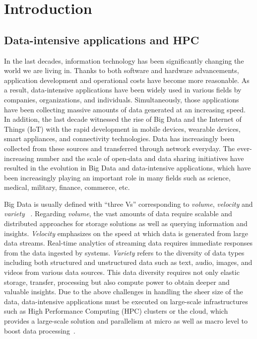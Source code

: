 \chapter{Introduction}
\label{introduction}

\section{Data-intensive applications and HPC}

In the last decades, information technology has been significantly changing the 
world we are living in. 
Thanks to both software and hardware advancements, application development 
and operational costs have become more reasonable. 
As a result, data-intensive applications have been widely used in various fields 
by companies, organizations, and individuals. 
Simultaneously, those applications have been 
collecting massive amounts of data generated at an increasing speed.
In addition, the last decade witnessed the rise of Big Data and the Internet of Things (IoT) with the rapid 
development in mobile devices, wearable devices, smart appliances, 
and connectivity technologies. Data has increasingly been collected from 
these sources and transferred through network everyday. 
The ever-increasing number and the scale of open-data and data sharing initiatives 
have resulted in the evolution in Big Data and data-intensive applications, 
which have been increasingly playing an important role in many fields such as 
science, medical, military, finance, commerce, etc.

Big Data is usually defined with ``three Vs'' corresponding to \textit{volume}, 
\textit{velocity} and \textit{variety} ~\cite{de2016formal}.  
Regarding \textit{volume}, the vast amounts of data require scalable and distributed 
approaches for storage solutions as well as querying information and insights.  
\textit{Velocity} emphasizes on the speed at which data is generated from large data 
streams. Real-time analytics of streaming data requires immediate responses 
from the data ingested by systems.
\textit{Variety} refers to the diversity of data types including both structured and 
unstructured data such as text, audio, images, and videos from various data sources.
This data diversity requires not only elastic storage, transfer, processing but also 
compute power to obtain deeper and valuable insights.  
Due to the above challenges in handling the sheer size of the data, data-intensive 
applications must be executed on large-scale infrastructures such as High Performance 
Computing (HPC) clusters or the cloud, which provides a large-scale solution 
and parallelism at micro as well as macro level to boost data 
processing~\cite{philipchen2014}.

